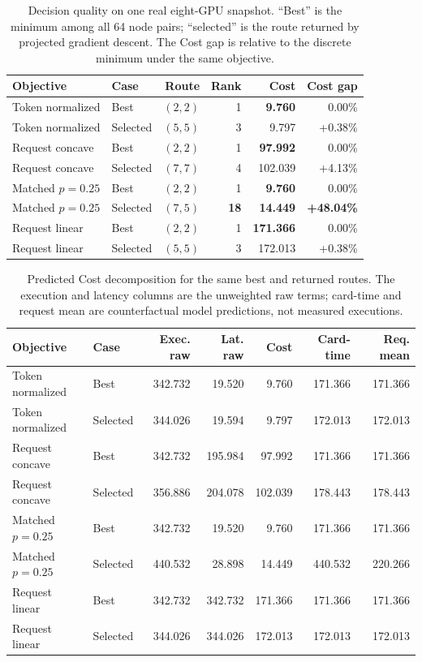 \documentclass[10pt]{article}
\newcommand{\keydata}[1]{\textcolor{green!40!black}{\textbf{#1}}}
\newcommand{\alertdata}[1]{\textcolor{red!70!black}{\textbf{#1}}}
\begin{document}
\begin{table}[t]
\centering
\small
\caption{Decision quality on one real eight-GPU snapshot. ``Best'' is the
minimum among all 64 node pairs; ``selected'' is the route returned by
projected gradient descent. The Cost gap is relative to the discrete minimum
under the same objective.}
\label{tab:decision-snapshot}
\begin{tabular}{llrrrr}
\toprule
Objective & Case & Route & Rank & Cost & Cost gap \\
\midrule
Token normalized & Best & \keydata{$(2,2)$} & 1 & \keydata{9.760} & 0.00\% \\
Token normalized & Selected & $(5,5)$ & 3 & 9.797 & +0.38\% \\
Request concave & Best & \keydata{$(2,2)$} & 1 & \keydata{97.992} & 0.00\% \\
Request concave & Selected & $(7,7)$ & 4 & 102.039 & +4.13\% \\
Matched $p=0.25$ & Best & \keydata{$(2,2)$} & 1 & \keydata{9.760} & 0.00\% \\
Matched $p=0.25$ & Selected & \alertdata{$(7,5)$} & \alertdata{18} & \alertdata{14.449} & \alertdata{+48.04\%} \\
Request linear & Best & \keydata{$(2,2)$} & 1 & \keydata{171.366} & 0.00\% \\
Request linear & Selected & $(5,5)$ & 3 & 172.013 & +0.38\% \\
\bottomrule
\end{tabular}
\end{table}

\begin{table}[t]
\centering
\small
\caption{Predicted Cost decomposition for the same best and returned routes.
The execution and latency columns are the unweighted raw terms; card-time and
request mean are counterfactual model predictions, not measured executions.}
\label{tab:decision-snapshot-components}
\begin{tabular}{llrrrrr}
\toprule
Objective & Case & Exec. raw & Lat. raw & Cost & Card-time & Req. mean \\
\midrule
Token normalized & Best & 342.732 & 19.520 & 9.760 & 171.366 & 171.366 \\
Token normalized & Selected & 344.026 & 19.594 & 9.797 & 172.013 & 172.013 \\
Request concave & Best & 342.732 & 195.984 & 97.992 & 171.366 & 171.366 \\
Request concave & Selected & 356.886 & 204.078 & 102.039 & 178.443 & 178.443 \\
Matched $p=0.25$ & Best & 342.732 & 19.520 & 9.760 & 171.366 & 171.366 \\
Matched $p=0.25$ & Selected & 440.532 & 28.898 & 14.449 & 440.532 & 220.266 \\
Request linear & Best & 342.732 & 342.732 & 171.366 & 171.366 & 171.366 \\
Request linear & Selected & 344.026 & 344.026 & 172.013 & 172.013 & 172.013 \\
\bottomrule
\end{tabular}
\end{table}
\end{document}
